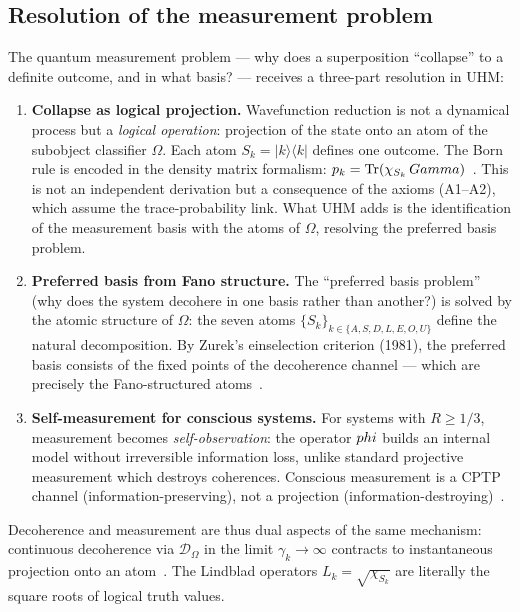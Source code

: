 \subsection{Resolution of the measurement problem}
\label{subsec:measurement}

The quantum measurement problem --- why does a superposition ``collapse'' to a definite
outcome, and in what basis? --- receives a three-part resolution in UHM:

\begin{enumerate}[leftmargin=2em]
  \item \textbf{Collapse as logical projection.} Wavefunction reduction is not a dynamical
        process but a \emph{logical operation}: projection of the state onto an atom of the
        subobject classifier $\Omega$. Each atom $S_k = |k\rangle\langle k|$ defines one
        outcome. The Born rule is encoded in the density matrix formalism:
        $p_k = \Tr(\chi_{S_k}\,Gamma)$~. This is not an independent derivation
        but a consequence of the axioms (A1--A2), which assume the trace-probability link.
        What UHM adds is the identification of the measurement basis with the atoms of
        $\Omega$, resolving the preferred basis problem.
  \item \textbf{Preferred basis from Fano structure.} The ``preferred basis problem''
        (why does the system decohere in one basis rather than another?) is solved by
        the atomic structure of $\Omega$: the seven atoms
        $\{S_k\}_{k \in \{A,S,D,L,E,O,U\}}$ define the natural decomposition. By
        Zurek's einselection criterion (1981), the preferred basis consists of the
        fixed points of the decoherence channel --- which are precisely the
        Fano-structured atoms~.
  \item \textbf{Self-measurement for conscious systems.} For systems with $R \geq 1/3$,
        measurement becomes \emph{self-observation}: the operator $phi$ builds an internal
        model without irreversible information loss, unlike standard projective measurement
        which destroys coherences. Conscious measurement is a CPTP channel (information-preserving),
        not a projection (information-destroying)~.
\end{enumerate}

Decoherence and measurement are thus dual aspects of the same mechanism: continuous
decoherence via $\mathcal{D}_\Omega$ in the limit $\gamma_k \to \infty$ contracts to
instantaneous projection onto an atom~. The Lindblad operators
$L_k = \sqrt{\chi_{S_k}}$ are literally the square roots of logical truth values.
